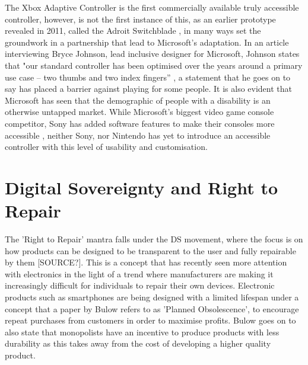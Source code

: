 The Xbox Adaptive Controller is the first commercially available truly accessible controller, however, is not the first instance of this, as an earlier prototype revealed in 2011, called the Adroit Switchblade \cite{ablegamer}, in many ways set the groundwork in a partnership that lead to Microsoft's adaptation.
In an article interviewing Bryce Johnson, lead inclusive designer for Microsoft, Johnson states that "our standard controller has been optimised over the years around a primary use case – two thumbs and two index fingers” \cite{disabilitygaming}, a statement that he goes on to say has placed a barrier against playing for some people.
It is also evident that Microsoft has seen that the demographic of people with a disability is an otherwise untapped market.
While Microsoft's biggest video game console competitor, Sony has added software features to make their consoles more accessible \cite{sony}, neither Sony, nor Nintendo has yet to introduce an accessible controller with this level of usability and customisation.


\section{Digital Sovereignty and Right to Repair}

The 'Right to Repair' mantra falls under the DS movement, where the focus is on how products can be designed to be transparent to the user and fully repairable by them [SOURCE?].
This is a concept that has recently seen more attention with electronics in the light of a trend where manufacturers are making it increasingly difficult for individuals to repair their own devices.
Electronic products such as smartphones are being designed with a limited lifespan under a concept that a paper by Bulow \cite{obsolescence} refers to as 'Planned Obsolescence', to encourage repeat purchases from customers in order to maximise profits.
Bulow goes on to also state that monopolists have an incentive to produce products with less durability as this takes away from the cost of developing a higher quality product.

